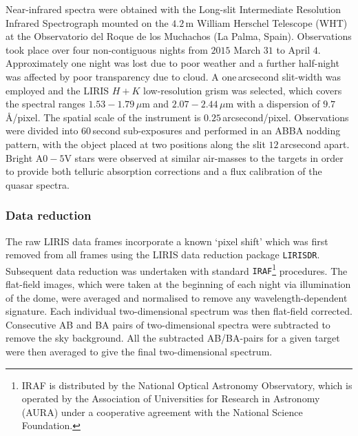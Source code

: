 Near-infrared spectra were obtained with the Long-slit Intermediate Resolution Infrared Spectrograph \citep[LIRIS;][]{manchado98} mounted on the $4.2$\,m William Herschel Telescope (WHT) at the Observatorio del Roque de los Muchachos (La Palma, Spain). 
Observations took place over four non-contiguous nights from $2015$ March $31$ to April $4$. 
Approximately one night was lost due to poor weather and a further half-night was affected by poor transparency due to cloud. 
A one\,arcsecond slit-width was employed and the LIRIS $H+K$ low-resolution grism was selected, which covers the spectral ranges $1.53-1.79$\,$\mu$m and $2.07-2.44$\,$\mu$m with a dispersion of $9.7$\,\AA/pixel. 
The spatial scale of the instrument is $0.25$\,arcsecond/pixel. 
Observations were divided into $60$\,second sub-exposures and performed in an ABBA nodding pattern, with the object placed at two positions along the slit $12$\,arcsecond apart. 
Bright A$0-5$V stars were observed at similar air-masses to the targets in order to provide both telluric absorption corrections and a flux calibration of the quasar spectra.

\subsubsection{Data reduction}

The raw LIRIS data frames incorporate a known `pixel shift' which was first removed from all frames using the LIRIS data reduction package {\tt LIRISDR}. 
Subsequent data reduction was undertaken with standard {\tt IRAF}\footnote{IRAF is distributed by the National Optical Astronomy Observatory, which is operated by the Association of Universities for Research in Astronomy (AURA) under a cooperative agreement with the National Science Foundation.} procedures.  
The flat-field images, which were taken at the beginning of each night via illumination of the dome, were averaged and normalised to remove any wavelength-dependent signature. 
Each individual two-dimensional spectrum was then flat-field corrected. 
Consecutive AB and BA pairs of two-dimensional spectra were subtracted to remove the sky background. 
All the subtracted AB/BA-pairs for a given target were then averaged to give the final two-dimensional spectrum.

